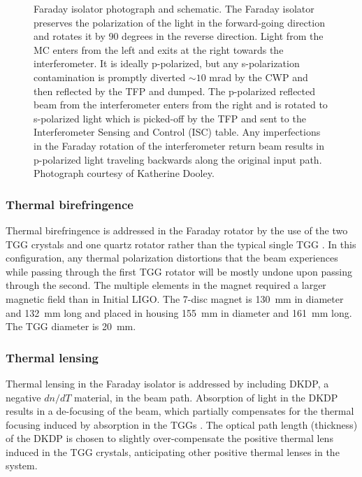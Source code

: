 \begin{figure}
\begin{centering}
\caption[Faraday isolator photograph and schematic.]{Faraday isolator
  photograph and schematic. The Faraday isolator preserves the
  polarization of the light in the forward-going direction and rotates
  it by 90 degrees in the reverse direction. Light from the MC enters
  from the left and exits at the right towards the interferometer. It
  is ideally p-polarized, but any s-polarization contamination is
  promptly diverted $\sim 10$ mrad by the CWP and then reflected by
  the TFP and dumped. The p-polarized reflected beam from the
  interferometer enters from the right and is rotated to s-polarized
  light which is picked-off by the TFP and sent to the Interferometer
  Sensing and Control (ISC) table. Any imperfections in the Faraday
  rotation of the interferometer return beam results in p-polarized
  light traveling backwards along the original input path. Photograph
  courtesy of Katherine Dooley.}
\label{fig:FI}
\end{centering}
\end{figure}

\subsubsection{Thermal birefringence} 
Thermal birefringence is addressed in the Faraday rotator by the use
of the two TGG crystals and one quartz rotator rather than the typical
single TGG \citep{Khazanov2000Suppression}.  In this configuration,
any thermal polarization distortions that the beam experiences while
passing through the first TGG rotator will be mostly undone upon
passing through the second. The multiple elements in the magnet
required a larger magnetic field than in Initial LIGO.
The 7-disc magnet is 130~mm in diameter and 132~mm long and placed in
housing 155~mm in diameter and 161~mm long. The TGG diameter is 20~mm.

\subsubsection{Thermal lensing}  
Thermal lensing in the Faraday isolator is addressed by including
DKDP, a negative $dn/dT$ material, in the beam path. Absorption of
light in the DKDP results in a de-focusing of the beam, which
partially compensates for the thermal focusing induced by absorption
in the TGGs \citep{Mueller2002Method, Khazanov2004Compensation}.  The
optical path length (thickness) of the DKDP is chosen to slightly
over-compensate the positive thermal lens induced in the TGG crystals,
anticipating other positive thermal lenses in the system.

